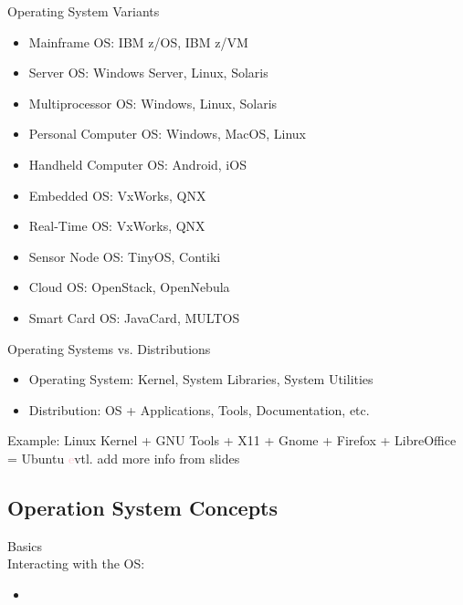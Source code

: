 \begin{theorem}{Operating System Variants}
    \begin{itemize}
        \item Mainframe OS: IBM z/OS, IBM z/VM
        \item Server OS: Windows Server, Linux, Solaris
        \item Multiprocessor OS: Windows, Linux, Solaris
        \item Personal Computer OS: Windows, MacOS, Linux
        \item Handheld Computer OS: Android, iOS
        \item Embedded OS: VxWorks, QNX
        \item Real-Time OS: VxWorks, QNX
        \item Sensor Node OS: TinyOS, Contiki
        \item Cloud OS: OpenStack, OpenNebula
        \item Smart Card OS: JavaCard, MULTOS
    \end{itemize}
\end{theorem}

\begin{corollary}{Operating Systems vs. Distributions}
    \begin{itemize}
        \item Operating System: Kernel, System Libraries, System Utilities
        \item Distribution: OS + Applications, Tools, Documentation, etc.
    \end{itemize}
    Example: Linux Kernel + GNU Tools + X11 + Gnome + Firefox + LibreOffice = Ubuntu
    \textcolor{pink} evtl. add more info from slides
\end{corollary}

\subsection{Operation System Concepts}

\begin{concept}{Basics}\\
    Interacting with the OS:
    \begin{itemize}
        \item 
    \end{itemize}
    
\end{concept}

\raggedcolumns

